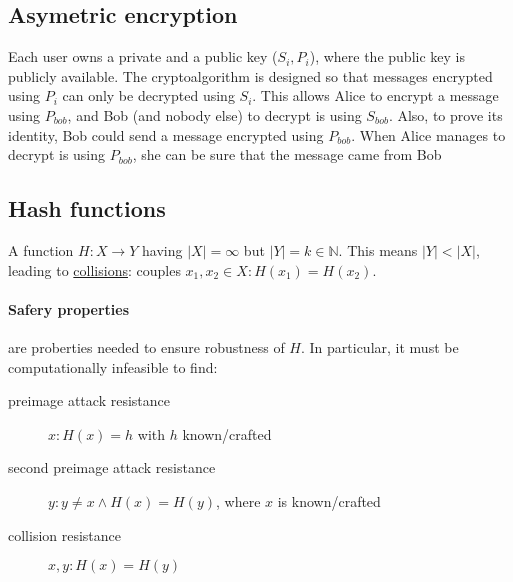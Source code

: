 \documentclass{article}
\begin{document}
\subsection{Asymetric encryption}
Each user owns a private and a public key ($S_i,P_i$), where the public key is publicly available. The cryptoalgorithm is designed so that messages encrypted using $P_i$ can only be decrypted using $S_i$. This allows Alice to encrypt a message using $P_{bob}$, and Bob (and nobody else) to decrypt is using $S_{bob}$.
Also, to prove its identity, Bob could send a message encrypted using $P_{bob}$. When Alice manages to decrypt is using $P_{bob}$, she can be sure that the message came from Bob


\subsection{Hash functions}
A function $H: X \to Y$ having $|X|=\infty$ but $|Y|=k \in \mathbb{N}$. This means $|Y|<|X|$, leading to \underline{collisions}: couples $x_1,x_2\in X: H(x_1)=H(x_2)$.
\paragraph{Safery properties} are proberties needed to ensure robustness of $H$. In particular, it must be computationally infeasible to find:
\begin{description}
\item[preimage attack resistance] $x: H(x)=h$ with $h$ known/crafted
\item[second preimage attack resistance] $y: y \neq x \wedge H(x)=H(y)$, where $x$ is known/crafted
\item[collision resistance] $x, y: H(x)=H(y)$  
\end{description}
\end{document}
